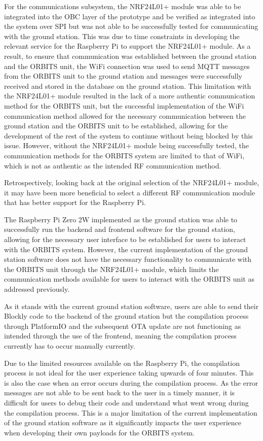 \documentclass[a4paper,12pt,titlepage]{report}
\begin{document}
For the communications subsystem, the NRF24L01+ module was able to be integrated into the OBC layer of the prototype and be verified as integrated into the system over SPI but was not able to be successfully tested for communicating with the ground station. This was due to time constraints in developing the relevant service for the Raspberry Pi to support the NRF24L01+ module. As a result, to ensure that communication was established between the ground station and the ORBITS unit, the WiFi connection was used to send MQTT messages from the ORBITS unit to the ground station and messages were successfully received and stored in the database on the ground station. This limitation with the NRF24L01+ module resulted in the lack of a more authentic communication method for the ORBITS unit, but the successful implementation of the WiFi communication method allowed for the necessary communication between the ground station and the ORBITS unit to be established, allowing for the development of the rest of the system to continue without being blocked by this issue. However, without the NRF24L01+ module being successfully tested, the communication methods for the ORBITS system are limited to that of WiFi, which is not as authentic as the intended RF communication method.

Retrospectively, looking back at the original selection of the NRF24L01+ module, it may have been more beneficial to select a different RF communication module that has better support for the Raspberry Pi. 

The Raspberry Pi Zero 2W implemented as the ground station was able to successfully run the backend and frontend software for the ground station, allowing for the necessary user interface to be established for users to interact with the ORBITS system. However, the current implementation of the ground station software does not have the necessary functionality to communicate with the ORBITS unit through the NRF24L01+ module, which limits the communication methods available for users to interact with the ORBITS unit as addressed previously.

As it stands with the current ground station software, users are able to send their Blockly code to the backend of the ground station but the compilation process through PlatformIO and the subsequent OTA update are not functioning as intended through the use of the frontend, meaning the compilation process currently has to occur manually currently.

Due to the limited resources available on the Raspberry Pi, the compilation process is not ideal for the user experience taking upwards of four minutes. This is also the case when an error occurs during the compilation process. As the error messages are not able to be sent back to the user in a timely manner, it is difficult for users to debug their code and understand what went wrong during the compilation process. This is a major limitation of the current implementation of the ground station software as it significantly impacts the user experience when developing their own payloads for the ORBITS system.
\end{document}
